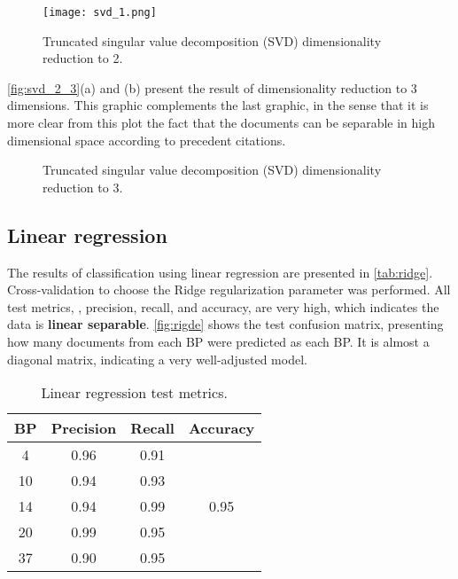         \begin{figure}[H]
                \texttt{[image: svd\_1.png]}
                \caption{Truncated singular value decomposition (SVD) dimensionality reduction to 2.}
                \label{fig:svd_1}
        \end{figure}

        \autoref{fig:svd_2_3}(a) and (b) present the result of dimensionality reduction to 3 dimensions. This graphic complements the last graphic, in the sense that it is more clear from this plot the fact that the documents can be separable in high dimensional space according to precedent citations.

        \begin{figure*}[!h]
                \centering
                \qquad
                \caption{Truncated singular value decomposition (SVD) dimensionality reduction to 3.}
                \label{fig:svd_2_3}
        \end{figure*}

    \subsection{Linear regression}

        The results of classification using linear regression are presented in \autoref{tab:ridge}. Cross-validation to choose the Ridge regularization parameter was performed. All test metrics, \ie, precision, recall, and accuracy, are very high, which indicates the data is \textbf{linear separable}. \autoref{fig:rigde} shows the test confusion matrix, presenting how many documents from each BP were predicted as each BP. It is almost a diagonal matrix, indicating a very well-adjusted model.

        \begin{table}[H]
                \centering
                \caption{Linear regression test metrics.}
                \label{tab:ridge}
                \begin{tabular}{c|cc|c}
                BP & Precision & Recall & Accuracy              \\ \hline
                4  & 0.96      & 0.91   & \multirow{5}{*}{0.95} \\
                10 & 0.94      & 0.93   &                       \\
                14 & 0.94      & 0.99   &                       \\
                20 & 0.99      & 0.95   &                       \\
                37 & 0.90      & 0.95   &                      
                \end{tabular}
        \end{table}


